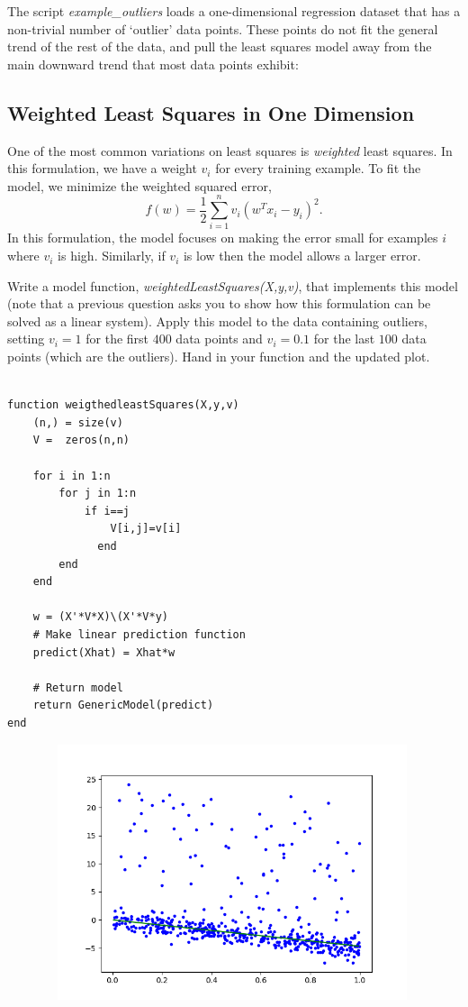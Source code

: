 \documentclass{article}
\def\blu#1{{\color{blu}#1}}
\newcommand{\centerfig}[2]{\begin{center}\texttt{[image: a2f/\#2]}\end{center}}
\begin{document}
The script \emph{example\_outliers} loads a one-dimensional regression dataset that has a non-trivial number of `outlier' data points. These points do not fit the general trend of the rest of the data, and pull the least squares model away from the main downward trend that most data points exhibit:




\subsection{Weighted Least Squares in One Dimension}

One of the most common variations on least squares is \emph{weighted} least squares. In this formulation, we have a weight $v_i$ for every training example. To fit the model, we minimize the weighted squared error,
\[
f(w) =  \frac{1}{2}\sum_{i=1}^n v_i(w^Tx_i - y_i)^2.
\]
In this formulation, the model focuses on making the error small for examples $i$ where $v_i$ is high. Similarly, if $v_i$ is low then the model allows a larger error.

Write a model function, \emph{weightedLeastSquares(X,y,v)}, that implements this model (note that a previous question asks you to show how this formulation can be solved as a linear system).
Apply this model to the data containing outliers, setting $v_i = 1$ for the first $400$ data points and $v_i = 0.1$ for the last $100$ data points (which are the outliers). \blu{Hand in your function and the updated plot}.


  \begin{verbatim}

function weigthedleastSquares(X,y,v)
    (n,) = size(v)
    V =  zeros(n,n)
     
    for i in 1:n
        for j in 1:n
            if i==j
                V[i,j]=v[i]
              end 
        end
    end
    
    w = (X'*V*X)\(X'*V*y)
    # Make linear prediction function
    predict(Xhat) = Xhat*w

    # Return model
    return GenericModel(predict)
end

  \end{verbatim}

\begin{figure}[h!]
  \includegraphics[width=30em,height=7.5cm]{a2_q5_1.png}

\end{figure}
\end{document}
